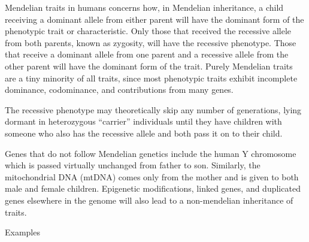 Mendelian traits in humans concerns how, in Mendelian inheritance, a child receiving a dominant allele from either parent will have the dominant form of the phenotypic trait or characteristic. Only those that received the recessive allele from both parents, known as zygosity, will have the recessive phenotype. Those that receive a dominant allele from one parent and a recessive allele from the other parent will have the dominant form of the trait. Purely Mendelian traits are a tiny minority of all traits, since most phenotypic traits exhibit incomplete dominance, codominance, and contributions from many genes.

The recessive phenotype may theoretically skip any number of generations, lying dormant in heterozygous ``carrier'' individuals until they have children with someone who also has the recessive allele and both pass it on to their child.

Genes that do not follow Mendelian genetics include the human Y chromosome which is passed virtually unchanged from father to son. Similarly, the mitochondrial DNA (mtDNA) comes only from the mother and is given to both male and female children. Epigenetic modifications, linked genes, and duplicated genes elsewhere in the genome will also lead to a non-mendelian inheritance of traits.

Examples

